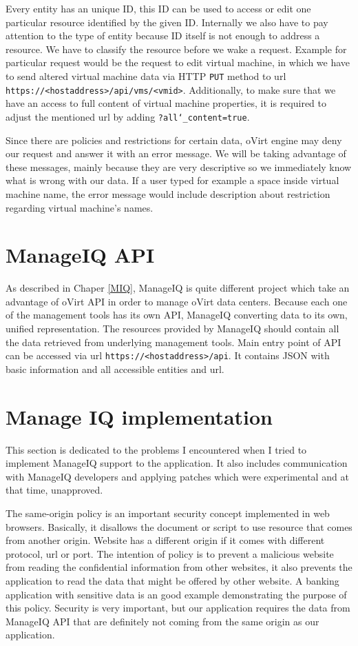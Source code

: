 Every entity has an unique ID, this ID can be used to access or edit one particular resource identified by the given ID. Internally we also have to pay attention to the type of entity because ID itself is not enough to address a resource. We have to classify the resource before we wake a request. Example for particular request would be the request to edit virtual machine, in which we have to send altered virtual machine data via HTTP \texttt{PUT} method to url \texttt{https://<hostaddress>/api/vms/<vmid>}. Additionally, to make sure that we have an access to full content of virtual machine properties, it is required to adjust the mentioned url by adding \texttt{?all\char`_content=true}.

Since there are policies and restrictions for certain data, oVirt engine may deny our request and answer it with an error message. We will be taking advantage of these messages, mainly because they are very descriptive so we immediately know what is wrong with our data. If a user typed for example a space inside virtual machine name, the error message would include description about restriction regarding virtual machine's names. 

\section{ManageIQ API}\label{miq}
As described in Chaper \ref{MIQ}, ManageIQ is quite different project which take an advantage of oVirt API in order to manage oVirt data centers. Because each one of the management tools has its own API, ManageIQ converting data to its own, unified representation. The resources provided by ManageIQ should contain all the data retrieved from underlying management tools.
Main entry point of API can be accessed via url \texttt{https://<hostaddress>/api}. It contains JSON with basic information and all accessible entities and url. 

\section{Manage IQ implementation}
This section is dedicated to the problems I encountered when I tried to implement ManageIQ support to the application. It also includes communication with ManageIQ developers and applying patches which were experimental and at that time, unapproved.

The same-origin policy \cite{policy} is an important security concept implemented in web browsers. Basically, it disallows the document or script to use resource that comes from another origin. Website has a different origin if it comes with different protocol, url or port. The intention of policy is to prevent a malicious website from reading the confidential information from other websites, it also prevents the application to read the data that might be offered by other website. A banking application with sensitive data is an good example demonstrating the purpose of this policy. Security is very important, but our application requires the data from ManageIQ API that are definitely not coming from the same origin as our application.

